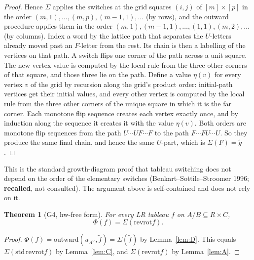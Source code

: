 \documentclass[11pt]{article}
\newtheorem{theorem}{Theorem}
\theoremstyle{definition}
\newcommand{\std}{\mathrm{std}}
\newcommand{\rr}{\mathrm{revrot}}
\begin{document}
\begin{proof}
Hence $\Sigma$ applies the switches at the grid squares $(i,j)$ of $[m]\times[p]$ in the order $(m,1),\dots,(m,p),(m-1,1),\dots$
(by rows), and the outward procedure applies them in the order $(m,1),(m-1,1),\dots,(1,1),(m,2),\dots$ (by columns). Index a
word by the lattice path that separates the $U$-letters already moved past an $F$-letter from the rest. Its chain is then a
labelling of the vertices on that path. A switch flips one corner of the path across a unit square. The new vertex value is
computed by the local rule from the three other corners of that square, and those three lie on the path. Define a value
$\eta(v)$ for every vertex $v$ of the grid by recursion along the grid's product order: initial-path vertices get their
initial values, and every other vertex is computed by the local rule from the three other corners of the unique square in
which it is the far corner. Each monotone flip sequence creates each vertex exactly once, and by induction along the sequence
it creates it with the value $\eta(v)$. Both orders are monotone flip sequences from the path $U\cdots UF\cdots F$ to the path
$F\cdots FU\cdots U$. So they produce the same final chain, and hence the same $U$-part, which is $\Sigma(F)=\tilde g$.
\end{proof}
This is the standard growth-diagram proof that tableau switching does not depend on the order of the elementary switches
(Benkart--Sottile--Stroomer 1996; \textbf{recalled}, not consulted). The argument above is self-contained and does not rely on it.

\begin{theorem}[G4, hw-free form]\label{thm:G4}
For every LR tableau $f$ on $A/B\subseteq R\times C$,
\[\Phi(f)=\Sigma(\rr f).\]
\end{theorem}
\begin{proof}
$\Phi(f)=\text{outward}(u_{A^\vee},\tilde f)=\Sigma(\tilde f)$ by Lemma~\ref{lem:D}. This equals $\Sigma(\std\,\rr f)$ by
Lemma~\ref{lem:C}, and $\Sigma(\rr f)$ by Lemma~\ref{lem:A}.
\end{proof}
\end{document}
